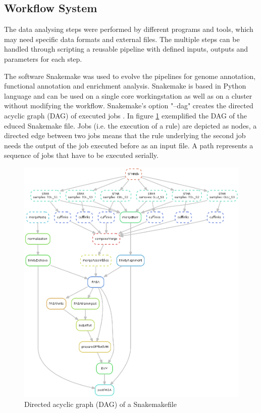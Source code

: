 \documentclass[12pt, a4paper]{report}
\begin{document}
\subsection{Workflow System}
The data analysing steps were performed by different programs and tools, which may need specific data formats and external files. The multiple steps can be handled through scripting a reusable pipeline with defined inputs, outputs and parameters for each step. 

The software Snakemake was used to evolve the pipelines for genome annotation, functional annotation and enrichment analysis. Snakemake is based in Python language and can be used on a single core workingstation as well as on a cluster without modifying the workflow. 
Snakemake's option "--dag" creates the directed acyclic graph (DAG) of executed jobs \cite{Koster2012}.   
\newline
In figure \ref{fig:DAG} exemplified the DAG of the educed Snakemake file. Jobs (i.e. the execution of a rule) are depicted as nodes, a directed edge between two jobs means that the rule underlying the second job needs the output of the job executed before as an input file. A path represents a sequence of jobs that have to be executed serially.
\begin{figure}[H]
	\centering	
	\includegraphics[width=430pt]{pics/DAG.png}
	\caption[Directed acyclic graph (DAG)]
	{Directed acyclic graph (DAG) of a Snakemakefile}
	\label{fig:DAG}
\end{figure}
\end{document}
